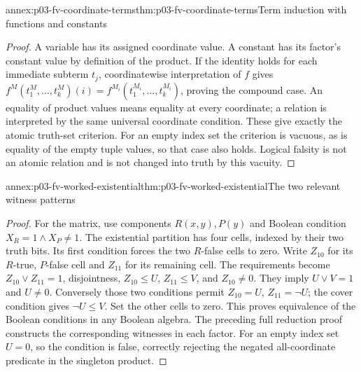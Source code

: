 \begin{annexitem}{annex:p03-fv-coordinate-terms}{thm:p03-fv-coordinate-terms}{Term induction with functions and constants}
\begin{proof}
A variable has its assigned coordinate value. A constant has its factor's
constant value by definition of the product. If the identity holds for each
immediate subterm \(t_j\), coordinatewise interpretation of \(f\) gives
\(f^M(t_1^M,\ldots,t_k^M)(i)=
f^{M_i}(t_1^{M_i},\ldots,t_k^{M_i})\), proving the compound case.
An equality of product values means equality at every coordinate; a relation
is interpreted by the same universal coordinate condition. These give exactly
the atomic truth-set criterion. For an empty index set the criterion is
vacuous, as is equality of the empty tuple values, so that case also holds.
Logical falsity is not an atomic relation and is not changed into truth by
this vacuity.
\end{proof}
\end{annexitem}
\begin{annexitem}{annex:p03-fv-worked-existential}{thm:p03-fv-worked-existential}{The two relevant witness patterns}
\begin{proof}
For the matrix, use components \(R(x,y),P(y)\) and Boolean condition
\(X_R=1\land X_P\ne1\). The existential partition has four cells,
indexed by their two truth bits. Its first condition forces the two
\(R\)-false cells to zero. Write \(Z_{10}\) for its \(R\)-true,
\(P\)-false cell and \(Z_{11}\) for its remaining cell. The requirements
become \(Z_{10}\vee Z_{11}=1\), disjointness,
\(Z_{10}\le U\), \(Z_{11}\le V\), and \(Z_{10}\ne0\).
They imply \(U\vee V=1\) and \(U\ne0\). Conversely those two
conditions permit \(Z_{10}=U\), \(Z_{11}=\neg U\); the cover condition
gives \(\neg U\le V\). Set the other cells to zero. This proves
equivalence of the Boolean conditions in any Boolean algebra. The preceding
full reduction proof constructs the corresponding witnesses in each factor.
For an empty index set \(U=0\), so the condition is false, correctly
rejecting the negated all-coordinate predicate in the singleton product.
\end{proof}
\end{annexitem}

